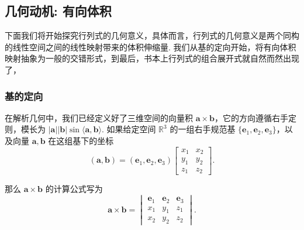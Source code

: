 \documentclass[10pt,openany]{article}
\theoremstyle{thmstyle} %
\theoremstyle{defstyle} %
\theoremstyle{prostyle} %
\theoremstyle{exastyle}
\theoremstyle{remstyle}
\newcommand{\R}{\mathbb{R}}
\begin{document}
\subsection{几何动机: 有向体积}
\label{2.3}

下面我们将开始探究行列式的几何意义，具体而言，行列式的几何意义是两个同构的线性空间之间的线性映射带来的体积伸缩量. 我们从基的定向开始，将有向体积映射抽象为一般的交错形式，到最后，书本上行列式的组合展开式就自然而然出现了，

\subsubsection{基的定向}\label{Sec 2.3.1}


在解析几何中，我们已经定义好了三维空间的向量积 \( \bm{a} \times \bm{b} \)，它的方向遵循右手定则，模长为 \( |\bm{a}||\bm{b}|\sin \langle \bm{a},\bm{b} \rangle \). 如果给定空间 \( \R^3 \) 的一组右手规范基 \( \{\bm{e}_1,\bm{e}_2,\bm{e}_3 \} \)，以及向量 \( \bm{a}, \bm{b} \) 在这组基下的坐标
\[ (\bm{a},\bm{b})=(\bm{e}_1,\bm{e}_2,\bm{e}_3)\begin{bmatrix}
	x_1 & x_2 \\ y_1 & y_2 \\ z_1 & z_2
\end{bmatrix}. \]

那么 \( \bm{a} \times \bm{b} \) 的计算公式写为
\[ \bm{a} \times \bm{b}= \begin{vmatrix}
	\bm{e}_1 & \bm{e}_2 & \bm{e}_3 \\
	x_1 & y_1 & z_1 \\
	x_2 & y_2 & z_2
\end{vmatrix}. \]
\end{document}
